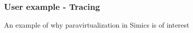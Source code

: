 \begin{frame}
\frametitle{User example - Tracing}

An example of why paravirtualization in Simics is of interest

\end{frame}
